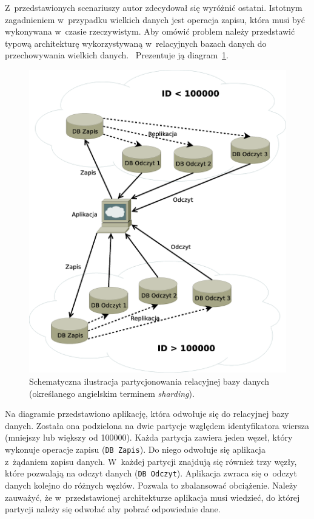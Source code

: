 Z~przedstawionych scenariuszy autor zdecydował się wyróżnić ostatni. Istotnym zagadnieniem w~przypadku wielkich danych jest operacja zapisu, która musi być wykonywana w~czasie rzeczywistym. Aby omówić problem należy przedstawić typową architekturę wykorzystywaną w~relacyjnych bazach danych do przechowywania wielkich danych.~\cite{sharding_in_mysql} Prezentuje ją diagram~\ref{fig:sharding}.

\begin{figure}[ht!]
	\centering
	\includegraphics[width=.8\textwidth]{figures/sharding.eps}
	\caption{Schematyczna ilustracja partycjonowania relacyjnej bazy danych (określanego angielskim terminem \emph{sharding}).}
	\label{fig:sharding}
\end{figure}

Na diagramie przedstawiono aplikację, która odwołuje się do relacyjnej bazy danych. Została ona podzielona na dwie partycje względem identyfikatora wiersza (mniejszy lub większy od 100000). Każda partycja zawiera jeden węzeł, który wykonuje operacje zapisu (\verb+DB Zapis+). Do niego odwołuje się aplikacja z~żądaniem zapisu danych. W~każdej partycji znajdują się również trzy węzły, które pozwalają na odczyt danych (\verb+DB Odczyt+). Aplikacja zwraca się o~odczyt danych kolejno do różnych węzłów. Pozwala to zbalansować obciążenie. Należy zauważyć, że w~przedstawionej architekturze aplikacja musi wiedzieć, do której partycji należy się odwołać aby pobrać odpowiednie dane.

